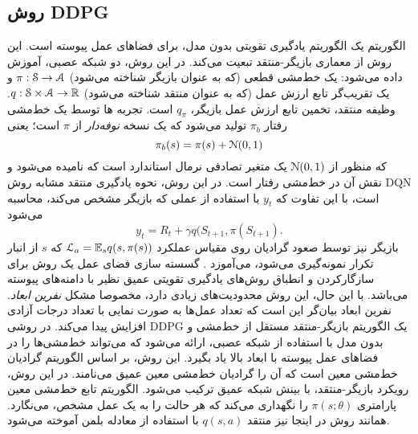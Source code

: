 \subsection{روش DDPG}
الگوریتم 
\textit{}
یک الگوریتم یادگیری تقویتی بدون مدل، برای فضاهای عمل پیوسته است. این روش از معماری بازیگر-منتقد تبعیت می‌کند. در این روش، دو شبکه عصبی،  آموزش داده می‌شود: یک خط‌مشی قطعی (که به عنوان بازیگر شناخته می‌شود)
$\pi:\EuScript{S} \to \EuScript{A}$
و یک تقریب‌گر تابع ارزش عمل (که به عنوان منتقد شناخته می‌شود)
$q: \EuScript{S} \times \EuScript{A} \to \mathbb{R}$.
وظیفه منتقد، تخمین تابع ارزش عمل بازیگر،
$q_\pi$
است.
تجربه ها توسط یک خط‌مشی رفتار $\pi_b$ تولید می‌شود که یک نسخه 
\textit{{نوفه‌دار}}
از $\pi$ است؛ یعنی
$$\pi_b(s) = \pi(s) + \EuScript{N}(0,1)$$
که منظور از
$\EuScript{N}(0,1)$
یک متغیر تصادفی نرمال استاندارد است که 
\textit{}
نامیده می‌شود و نقش آن  در خط‌مشی رفتار است.
در این روش، نحوه یادگیری منتقد مشابه روش DQN است، با این تفاوت که $y_t$ با استفاده از عملی که بازیگر مشخص می‌کند، محاسبه می‌شود
$$y_t = R_t + \gamma q(S_{t+1},\pi(S_{t+1}).$$
بازیگر نیز توسط صعود گرادیان روی مقیاس عملکرد
$\EuScript{L}_a = \mathbb{E}_s q(s, \pi(s))$
که $s$ از انبار تکرار نمونه‌گیری می‌شود، می‌آموزد
\cite{andrychowicz2017hindsight}.
گسسته سازی فضای عمل یک روش برای سازگار‌کردن و انطباق روش‌های یادگیری تقویتی عمیق نظیر 
با دامنه‌های پیوسته می‌باشد. با این حال، این روش محدودیت‌های زیادی دارد، مخصوصا مشکل 
\textit{نفرین ابعاد}.
 نفرین ابعاد بیان‌گر این است که تعداد عمل‌ها به صورت نمایی با تعداد درجات آزادی افزایش پیدا می‌کند. 
در روشی DDPG یک الگوریتم بازیگر-منتقد مستقل از خط‌مشی و بدون مدل
با استفاده از شبکه عصبی، ارائه می‌شود که می‌تواند خط‌مشی‌ها را در فضاهای عمل پیوسته با ابعاد بالا یاد بگیرد.
این روش، بر اساس الگوریتم گرادیان خط‌مشی معین
است که آن را گرادیان خط‌مشی معین عمیق
می‌نامند. 
در این روش، رویکرد بازیگر-منتقد، با بینش شبکه  عمیق
ترکیب می‌شود.
الگوریتم 
تابع خط‌مشی معین پارامتری
$
\pi(s;\theta)	
$
را نگهداری می‌کند که هر حالت را به یک عمل مشخص، می‌نگارد.
همانند روش 
در اینجا نیز منتقد
$q(s,a)$
با استفاده از معادله بلمن آموخته می‌شود.

